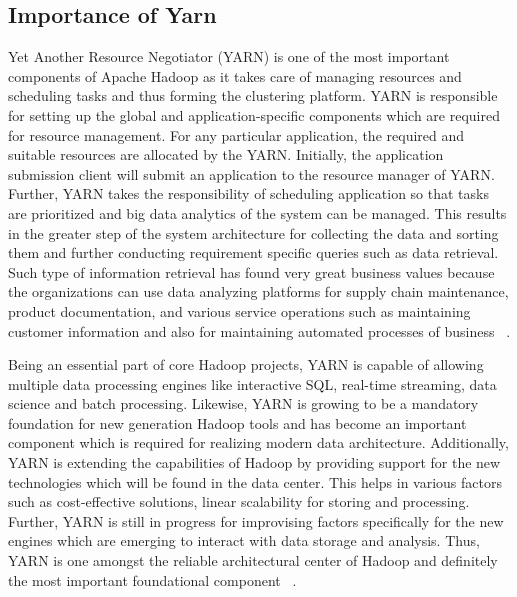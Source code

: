 \subsection{Importance of Yarn}
Yet Another Resource Negotiator (YARN) is one of the most important components 
of Apache Hadoop as it takes care of managing resources and scheduling tasks and
thus forming the clustering platform. YARN is responsible for setting up the 
global and application-specific components which are required for resource 
management. For any particular application, the required and suitable resources 
are allocated by the YARN. Initially, the application submission client will 
submit an application to the resource manager of YARN. Further, YARN takes the 
responsibility of scheduling application so that tasks are prioritized and big 
data analytics of the system can be managed. This results in the greater step 
of the system architecture for collecting the data and sorting them and further 
conducting requirement specific queries such as data retrieval. Such type of 
information retrieval has found very great business values because the 
organizations can use data analyzing platforms for supply chain maintenance, 
product documentation, and various service operations such as maintaining 
customer information and also for maintaining automated processes of business
~\cite{hid-sp18-406-hadoop-intro6}.

Being an essential part of core Hadoop projects, YARN is capable of allowing 
multiple data processing engines like interactive SQL, real-time streaming, data
science and batch processing. Likewise, YARN is growing to be a mandatory 
foundation for new generation Hadoop tools and has become an important component
which is required for realizing modern data architecture. Additionally, YARN is 
extending the capabilities of Hadoop by providing support for the new 
technologies which will be found in the data center. This helps in various 
factors such as cost-effective solutions, linear scalability for storing and 
processing. Further, YARN is still in progress for improvising factors 
specifically for the new engines which are emerging to interact with data 
storage and analysis. Thus, YARN is one amongst the reliable architectural 
center of Hadoop  and definitely  the most important foundational component
~\cite{hid-sp18-406-hadoop-intro7}.

